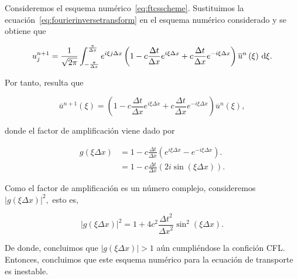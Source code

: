 \begin{example}
  Consideremos el esquema numérico~\eqref{eq:ftcsscheme}.
  Sustituimos la ecuación~\eqref{eq:fourierinversetransform} en el
  esquema numérico considerado y se obtiene que

  \begin{equation*}
    u^{n+1}_{j}=
    \frac{1}{\sqrt{2\pi}}
    \int_{-\frac{\pi}{\Delta x}}^{\frac{\pi}{\Delta x}}
    e^{i\xi j \Delta x}
    \left(
    1-c\frac{\Delta t}{\Delta x}
    e^{i \xi \Delta x}+
    c\frac{\Delta t}{\Delta x}
    e^{-i\xi\Delta x}\right)
    \overline{u}^{n}
    \left(\xi\right)
    \dl\xi.
  \end{equation*}

  Por tanto, resulta que

  \begin{equation*}
    \bar{u}^{n+1}
    \left(\xi\right)=
    \left(
    1-
    c\frac{\Delta t}{\Delta x}
    e^{i\xi\Delta x}+
    c\frac{\Delta t}{\Delta x}
    e^{-i\xi\Delta x}
    \right)
    \overline{u}^{n}
    \left(\xi\right),
  \end{equation*}

  donde el factor de amplificación viene dado por

  \begin{align*}
    g
    \left(\xi\Delta x\right) & =
    1-
    c\frac{\Delta t}{\Delta x}
    \left(
    e^{i\xi\Delta x}-
    e^{-i\xi\Delta x}
    \right).                     \\
                             & =
    1-
    c\frac{\Delta t}{\Delta x}
    \left(
    2i\sin
    \left(\xi\Delta x\right)
    \right).
  \end{align*}

  Como el factor de amplificación es un número complejo, consideremos
  \begin{math}
    {\left|
      g\left(\xi\Delta x\right)
      \right|}^{2},
  \end{math}
  esto es,

  \begin{equation*}
    \left|
    g
    \left(\xi\Delta x\right)
    \right|^{2}=
    1+
    4c^{2}
    \frac{{\Delta t}^{2}}{{\Delta x}^{2}}
    \sin^{2}
    \left(\xi\Delta x\right).
  \end{equation*}

  De donde, concluimos que
  \begin{math}
    \left|
    g\left(\xi\Delta x\right)
    \right|>
    1
  \end{math}
  aún cumpliéndose la confición CFL.
  Entonces, concluimos que este esquema numérico para la ecuación de
  transporte es inestable.
\end{example}

